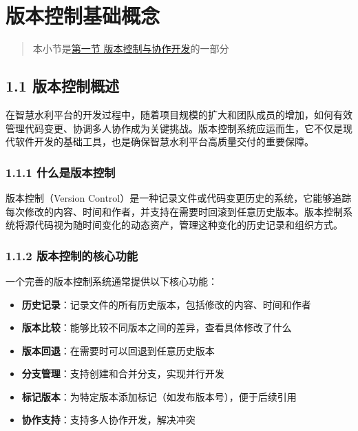 \section{版本控制基础概念}\label{ux7248ux672cux63a7ux5236ux57faux7840ux6982ux5ff5}

\begin{quote}
本小节是\href{section03-01.md}{第一节 版本控制与协作开发}的一部分
\end{quote}

\subsection{1.1
版本控制概述}\label{ux7248ux672cux63a7ux5236ux6982ux8ff0}

在智慧水利平台的开发过程中，随着项目规模的扩大和团队成员的增加，如何有效管理代码变更、协调多人协作成为关键挑战。版本控制系统应运而生，它不仅是现代软件开发的基础工具，也是确保智慧水利平台高质量交付的重要保障。

\subsubsection{1.1.1
什么是版本控制}\label{ux4ec0ux4e48ux662fux7248ux672cux63a7ux5236}

版本控制（Version
Control）是一种记录文件或代码变更历史的系统，它能够追踪每次修改的内容、时间和作者，并支持在需要时回滚到任意历史版本。版本控制系统将源代码视为随时间变化的动态资产，管理这种变化的历史记录和组织方式。

\subsubsection{1.1.2
版本控制的核心功能}\label{ux7248ux672cux63a7ux5236ux7684ux6838ux5fc3ux529fux80fd}

一个完善的版本控制系统通常提供以下核心功能：

\begin{itemize}
\tightlist
\item
  \textbf{历史记录}：记录文件的所有历史版本，包括修改的内容、时间和作者
\item
  \textbf{版本比较}：能够比较不同版本之间的差异，查看具体修改了什么
\item
  \textbf{版本回退}：在需要时可以回退到任意历史版本
\item
  \textbf{分支管理}：支持创建和合并分支，实现并行开发
\item
  \textbf{标记版本}：为特定版本添加标记（如发布版本号），便于后续引用
\item
  \textbf{协作支持}：支持多人协作开发，解决冲突
\end{itemize}

